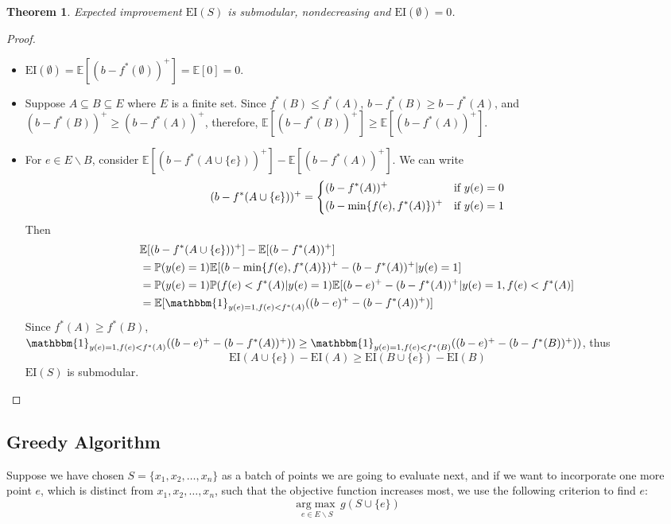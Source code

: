 \documentclass[12pt]{article}
\newcommand{\E}{\mathbb{E}}
\newcommand{\EI}{\mathrm{EI}}
\newtheorem{thm}{Theorem}
\begin{document}
\begin{thm}
Expected improvement $\EI(S)$ is submodular, nondecreasing and $\EI(\emptyset)=0$.
\end{thm}
\begin{proof}
\begin{itemize}
\item
$\EI(\emptyset) = \E[(b-f^*(\emptyset))^+] = \E[0] = 0$.
\item
Suppose $A \subseteq B \subseteq E$ where $E$ is a finite set. Since $f^*(B) \leq f^*(A)$, $b-f^*(B) \geq b-f^*(A)$, and $(b-f^*(B))^+ \geq (b-f^*(A))^+$, therefore, $\E[(b-f^*(B))^+] \geq \E[(b-f^*(A))^+]$.
\item
For $e \in E\backslash B$, consider $\E[(b-f^*(A \cup \{e\}))^+]-\E[(b-f^*(A))^+]$. We can write
\begin{equation*}
(b-f^*(A \cup \{e\}))^+ = \begin{dcases}
                         (b-f^*(A))^+ & \text{if $y(e)=0$} \\
                         (b-\min\{f(e),f^*(A)\})^+ & \text{if $y(e)=1$}
                         \end{dcases}
\end{equation*}
Then 
\begin{align*}
&\E[(b-f^*(A \cup \{e\}))^+]-\E[(b-f^*(A))^+] \\
&= \mathbb{P}(y(e)=1) \E[(b-\min\{f(e),f^*(A)\})^+ -(b-f^*(A))^+|y(e)=1]\\
&= \mathbb{P}(y(e)=1) \mathbb{P}(f(e)<f^*(A)|y(e)=1) \E[(b-e)^+-(b-f^*(A))^+|y(e)=1, f(e)<f^*(A)]\\
&= \E[ \mathbbm{1}_{y(e)=1, f(e)<f^*(A)} ((b-e)^+-(b-f^*(A))^+)]
\end{align*}
Since $f^*(A) \geq f^*(B)$, $\mathbbm{1}_{y(e)=1, f(e)<f^*(A)} ((b-e)^+-(b-f^*(A))^+)) \geq \mathbbm{1}_{y(e)=1, f(e)<f^*(B)} ((b-e)^+-(b-f^*(B))^+))$, thus
\begin{equation*}
\EI(A\cup \{e\})-\EI(A) \geq \EI(B\cup \{e\})-\EI(B)
\end{equation*}
$\EI(S)$ is submodular.

\end{itemize}
\end{proof}



\subsection{Greedy Algorithm}
Suppose we have chosen $S=\{x_1, x_2, \ldots, x_n\}$ as a batch of points we are going to evaluate next, and if we want to incorporate one more point $e$, which is distinct from $x_1, x_2, \ldots, x_n$, such that the objective function increases most, we use the following criterion to find $e$:
\begin{equation} \label{eq:greedy}
\underset{e \in E \backslash S}{\mathrm{arg}\max} \,g(S \cup \{e\})
\end{equation}
\end{document}
